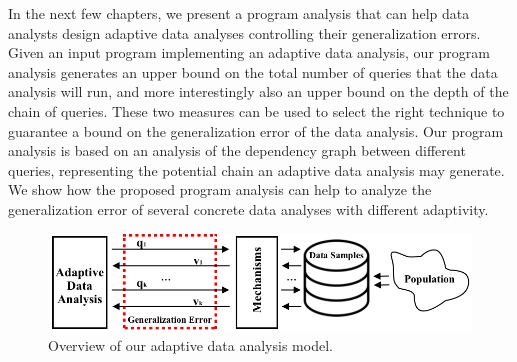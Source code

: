 In the next few chapters, we present a program analysis that can help data analysts design adaptive data analyses controlling their generalization errors. 
Given an input program implementing an adaptive data analysis, our program analysis generates an upper bound on the total number of queries that the data analysis will run, and more interestingly also an upper bound on the depth of the chain of queries. 
These two measures can be used to select the right technique to guarantee a bound on the generalization error of the data analysis. 
Our program analysis is based on an analysis of the dependency graph between different queries, representing the potential chain an adaptive data analysis may generate. 
We show how the proposed program analysis can help to analyze the generalization error of several concrete data analyses with different adaptivity.
\begin{figure}
    \centering
    \includegraphics[width=0.9\columnwidth]{chapters/adapt/overview-dissertation.png}
    \caption{Overview of our adaptive data analysis model. }
    \label{fig:adaptivity-model-overview}
\vspace{-0.5cm}
\end{figure}

